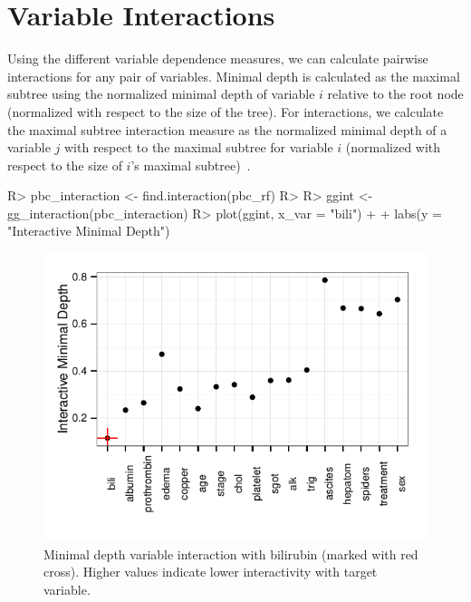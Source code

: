 \documentclass[nojss]{jss}\usepackage[]{graphicx}\usepackage[]{color}
\makeatletter
\def\maxwidth{ %
  \ifdim\Gin@nat@width>\linewidth
    \linewidth
  \else
    \Gin@nat@width
  \fi
}
\makeatother
\begin{document}
\section{Variable Interactions}\label{S:interactions}
Using the different variable dependence measures, we can calculate pairwise interactions for any pair of variables. Minimal depth is calculated as the maximal subtree using the normalized minimal depth of variable $i$ relative to the root node (normalized with respect to the size of the tree). For interactions, we calculate the maximal subtree interaction measure as the normalized minimal depth of a variable $j$ with respect to the maximal subtree for variable $i$ (normalized with respect to the size of $i$'s maximal subtree)~\citep{Ishwaran_HighDimension:2010,Ishwaran_HighDimension:2011}.

\begin{Schunk}
\begin{Sinput}
R> pbc_interaction <- find.interaction(pbc_rf)
R> 
R> ggint <- gg_interaction(pbc_interaction)
R> plot(ggint, x_var = "bili") + 
+   labs(y = "Interactive Minimal Depth")
\end{Sinput}
\end{Schunk}

\begin{Schunk}
\begin{figure}[!htpb]

{\centering \includegraphics[width=\maxwidth]{figure/rfs-interaction-1} 

}

\caption[Minimal depth variable interaction with bilirubin (marked with red cross)]{Minimal depth variable interaction with bilirubin (marked with red cross). Higher values indicate lower interactivity with target variable.\label{fig:interaction}}
\end{figure}
\end{Schunk}
\end{document}
